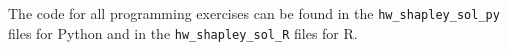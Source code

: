 \documentclass[a4paper]{article}
\begin{document}

The code for all programming exercises can be found in the \texttt{hw\_shapley\_sol\_py} files for Python and in the \texttt{hw\_shapley\_sol\_R} files for R.



\dlz



\dlz



\dlz


\end{document}
